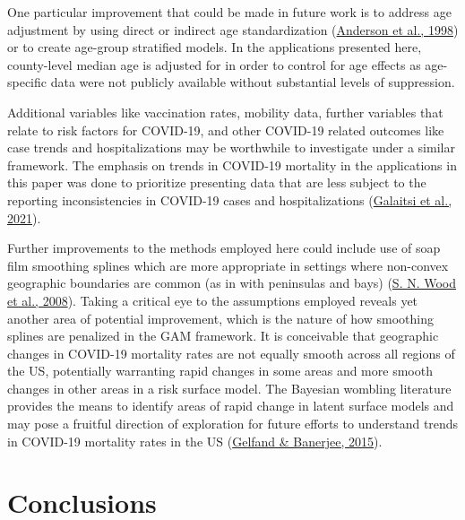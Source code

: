 \documentclass[
]{article}
\begin{document}
One particular improvement that could be made in future work is to address age
adjustment by using direct or indirect age standardization (\protect\hyperlink{ref-anderson_age_1998}{Anderson et al., 1998}) or
to create age-group stratified models. In the applications presented here,
county-level median age is adjusted for in order to control for age effects as
age-specific data were not publicly available without substantial levels of
suppression.

Additional variables like vaccination rates, mobility data, further variables
that relate to risk factors for COVID-19, and other COVID-19 related outcomes
like case trends and hospitalizations may be worthwhile to investigate under a
similar framework. The emphasis on trends in COVID-19 mortality in the
applications in this paper was done to prioritize presenting data that are less
subject to the reporting inconsistencies in COVID-19 cases and
hospitalizations (\protect\hyperlink{ref-galaitsi_challenges_2021}{Galaitsi et al., 2021}).

Further improvements to the methods employed here could include use of soap film
smoothing splines which are more appropriate in settings where non-convex
geographic boundaries are common (as in with peninsulas and bays)
(\protect\hyperlink{ref-wood_soap_2008}{S. N. Wood et al., 2008}). Taking a critical eye to the assumptions employed reveals yet
another area of potential improvement, which is the nature of how
smoothing splines are penalized in the GAM framework. It is conceivable that
geographic changes in COVID-19 mortality rates are not equally smooth across
all regions of the US, potentially warranting rapid changes in some areas
and more smooth changes in other areas in a risk surface model. The Bayesian
wombling literature provides the means to identify areas of rapid change in
latent surface models and may pose a fruitful direction of exploration for
future efforts to understand trends in COVID-19 mortality rates in the US
(\protect\hyperlink{ref-gelfand_bayesian_2015}{Gelfand \& Banerjee, 2015}).

\hypertarget{conclusions}{%
\section{Conclusions}\label{conclusions}}
\end{document}

